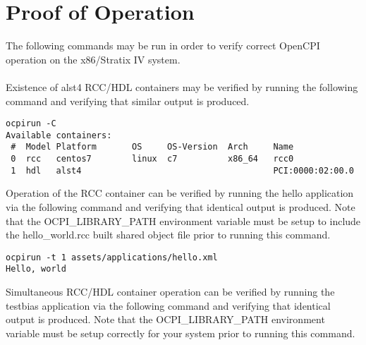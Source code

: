 \section{Proof of Operation}
The following commands may be run in order to verify correct OpenCPI operation on the x86/Stratix IV system.\\ \\
Existence of alst4 RCC/HDL containers may be verified by running the following command and verifying that similar output is produced.\\
\begin{lstlisting}
ocpirun -C
Available containers:
 #  Model Platform       OS     OS-Version  Arch     Name
 0  rcc   centos7        linux  c7          x86_64   rcc0
 1  hdl   alst4                                      PCI:0000:02:00.0
\end{lstlisting}
Operation of the RCC container can be verified by running the hello application via the following command and verifying that identical output is produced. Note that the OCPI\_LIBRARY\_PATH environment variable must be setup to include the hello\_world.rcc built shared object file prior to running this command.
\begin{lstlisting}
ocpirun -t 1 assets/applications/hello.xml
Hello, world
\end{lstlisting}
Simultaneous RCC/HDL container operation can be verified by running the testbias application via the following command and verifying that identical output is produced. Note that the OCPI\_LIBRARY\_PATH environment variable must be setup correctly for your system prior to running this command.\\
